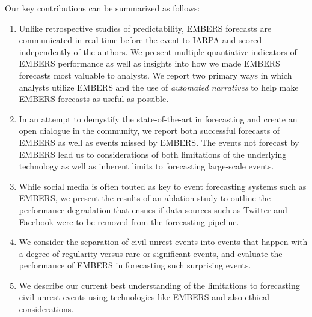 Our key contributions can be summarized as follows:
\begin{enumerate}
\item Unlike retrospective studies of predictability, EMBERS forecasts are communicated in real-time before the
event to IARPA and scored independently of the authors. 
We present multiple quantiative indicators of EMBERS performance 
as well as insights into how
we made EMBERS forecasts most valuable to analysts. We report two primary
ways in which analysts utilize EMBERS and the use of {\it automated
narratives} to help make EMBERS forecasts as useful as possible.

\item In an attempt to demystify the state-of-the-art
in forecasting and create an open dialogue in the community, we report both successful
forecasts of EMBERS as well as events missed by EMBERS. The events not forecast by EMBERS lead us to
considerations of both limitations of the underlying technology as well as inherent limits to
forecasting large-scale events.
\item While social media is often touted as key to event forecasting
systems such as EMBERS, we present the results of an ablation study to outline
the performance degradation that ensues if data sources 
such as Twitter and Facebook were to be removed from the forecasting pipeline.
\item We consider the separation of civil unrest events into events
that happen with a degree of regularity versus rare
or significant
events, and evaluate the performance of EMBERS in forecasting such
surprising events.
\item We describe our current best understanding of the limitations to
forecasting civil unrest events using technologies like EMBERS and 
also ethical considerations.
\end{enumerate}

